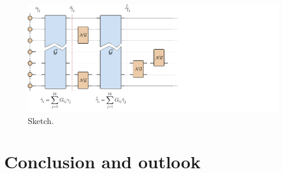 \documentclass[a4paper, twocolumn, superscriptaddress, longbibliography]{revtex4-2}
\begin{document}
	\begin{figure}[t]
		\centering
		\includegraphics[width=1.\textwidth]{Figs/Sketch/Sketch_circuit.pdf}
		\caption{Sketch.}
		\label{fig:sketch}
	\end{figure}

	\section{Conclusion and outlook}


	

      \begin{appendices}
	\end{appendices}
\end{document}

